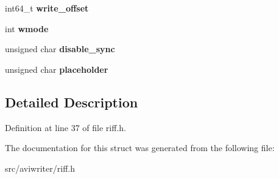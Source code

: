 \begin{DoxyCompactItemize}
\item 
\hypertarget{structriff__chunk_a200cb872802fb92593dcefc54462d40d}{int64\-\_\-t {\bfseries write\-\_\-offset}}\label{structriff__chunk_a200cb872802fb92593dcefc54462d40d}

\item 
\hypertarget{structriff__chunk_ab0dd241e6b8a042eca1210562e76fa95}{int {\bfseries wmode}}\label{structriff__chunk_ab0dd241e6b8a042eca1210562e76fa95}

\item 
\hypertarget{structriff__chunk_a96086dacbe6865ea8947b79bb8d1b85f}{unsigned char {\bfseries disable\-\_\-sync}}\label{structriff__chunk_a96086dacbe6865ea8947b79bb8d1b85f}

\item 
\hypertarget{structriff__chunk_a8b8ed824444ca63292ca77fdb91a5576}{unsigned char {\bfseries placeholder}}\label{structriff__chunk_a8b8ed824444ca63292ca77fdb91a5576}

\end{DoxyCompactItemize}


\subsection{Detailed Description}


Definition at line 37 of file riff.\-h.



The documentation for this struct was generated from the following file\-:\begin{DoxyCompactItemize}
\item 
src/aviwriter/riff.\-h\end{DoxyCompactItemize}
